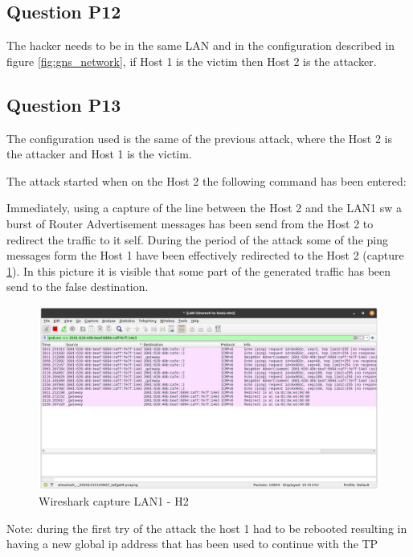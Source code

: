 \subsection{Question P12}
The hacker needs to be in the same LAN and in the configuration described in figure \ref{fig:gns_network}, if Host 1 is the victim then Host 2 is the attacker.

\subsection{Question P13}

The configuration used is the same of the previous attack, where the Host 2 is the attacker and Host 1 is the victim. 

The attack started when on the Host 2 the following command has been entered:

Immediately, using a capture of the line between the Host 2 and the LAN1 sw a burst of Router Advertisement messages has been send from the Host 2 to redirect the traffic to it self. During the period of the attack some of the ping messages form the Host 1 have been effectively redirected to the Host 2 (capture \ref{fig:deviated_ping}). In this picture it is visible that some part of the generated traffic has been send to the false destination.

\begin{figure}[H]
	\centering
	\includegraphics[width=\linewidth]{images/P13_deviated_ping.png}
	\caption{Wireshark capture LAN1 - H2}
	\label{fig:deviated_ping}
\end{figure}
 
Note: during the first try of the attack the host 1 had to be rebooted resulting in having a new global ip address that has been used to continue with the TP  

